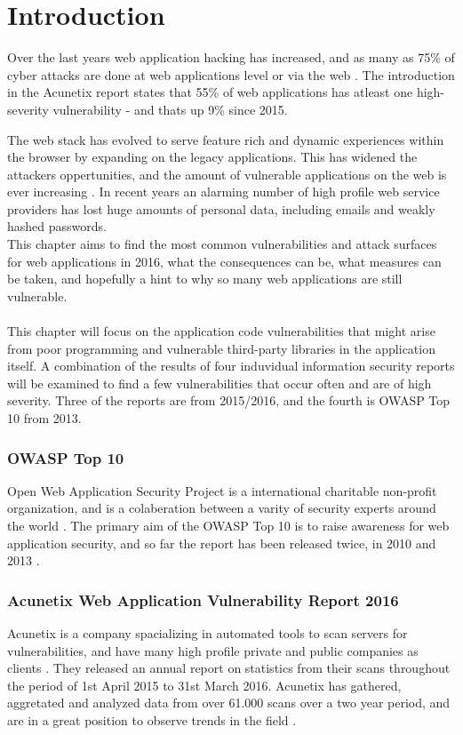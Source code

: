 \section{Introduction}
Over the last years web application hacking has increased, and as many as 75\% of cyber attacks are done at web applications level or via the web \cite{AcunetixCompany}. The introduction in the Acunetix report states that 55\% of web applications has atleast one high-severity vulnerability - and thats up 9\% since 2015.

The web stack has evolved to serve feature rich and dynamic experiences within the browser by expanding on the legacy applications. This has widened the attackers oppertunities, and the amount of vulnerable applications on the web is ever increasing \cite{Acunetix2016}. In recent years an alarming number of high profile web service providers has lost huge amounts of personal data, including emails and weakly hashed passwords. \\ This chapter aims to find the most common vulnerabilities and attack surfaces for web applications in 2016, what the consequences can be, what measures can be taken, and hopefully a hint to why so many web applications are still vulnerable.
\\ \\
This chapter will focus on the application code vulnerabilities that might arise from poor programming and vulnerable third-party libraries in the application itself. A combination of the results of four induvidual information security reports will be examined to find a few vulnerabilities that occur often and are of high severity. Three of the reports are from 2015/2016, and the fourth is OWASP Top 10 from 2013. 
\subsubsection{OWASP Top 10}
Open Web Application Security Project is a international charitable non-profit organization, and is a colaberation between a varity of security experts around the world \cite{OwaspCompany}. The primary aim of the OWASP Top 10 is to raise awareness for web application security, and so far the report has been released twice, in 2010 and 2013 \cite{OwaspTop10Project}.
\subsubsection{Acunetix Web Application Vulnerability Report 2016}
Acunetix is a company spacializing in automated tools to scan servers for vulnerabilities, and have many high profile private and public companies as clients \cite{AcunetixCompany}. They released an annual report on statistics from their scans throughout the period of 1st April 2015 to 31st March 2016. Acunetix has gathered, aggretated and analyzed data from over 61.000 scans over a two year period, and are in a great position to observe trends in the field \cite{Acunetix2016}. 
